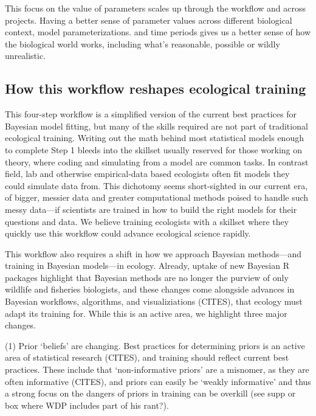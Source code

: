 \documentclass[11pt]{article}
\begin{document}
This focus on the value of parameters scales up through the workflow and across projects. Having a better sense of parameter values across different biological context, model parameterizations. and time periods gives us a better sense of how the biological world works, including what's reasonable, possible or wildly unrealistic. %

\subsection{How this workflow reshapes ecological training} %

This four-step workflow is a simplified version of the current best practices for Bayesian model fitting, but many of the skills required are not part of traditional ecological training. Writing out the math behind most statistical models enough to complete Step 1 bleeds into the skillset usually reserved for those working on theory, where coding and simulating from a model are common tasks. In contrast field, lab and otherwise empirical-data based ecologists often fit models they could simulate data from. This dichotomy seems short-sighted in our current era, of bigger, messier data and greater computational methods poised to handle such messy data---if scientists are trained in how to build the right models for their questions and data. We believe training ecologists with a skillset where they quickly use this workflow could advance ecological science rapidly. %

This workflow also requires a shift in how we approach Bayesian methods---and training in Bayesian models---in ecology. Already, uptake of new Bayesian \textsf{R} packages highlight that Bayesian methods are no longer the purview of only wildlife and fisheries biologists, and these changes come alongside advances in Bayesian workflows, algorithms, and visualiziations (CITES), that ecology must adapt its training for. While this is an active area, we highlight three major changes.

(1) Prior `beliefs' are changing. Best practices for determining priors is an active area of statistical research (CITES), and training should reflect current best practices. These include that `non-informative priors' are a misnomer, as they are often informative (CITES), and priors can easily be `weakly informative' and thus a strong focus on the dangers of priors in training can be overkill (see supp or box where WDP includes part of his rant?). 
\end{document}
